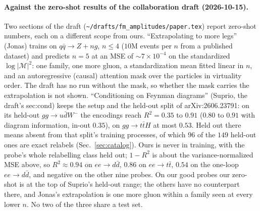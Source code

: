 \documentclass[11pt]{article}
\newcommand{\code}[1]{\texttt{#1}}
\begin{document}
\paragraph{Against the zero-shot results of the collaboration draft (2026-10-15).} Two sections of the draft
(\code{\textasciitilde/drafts/fm\_amplitudes/paper.tex}) report zero-shot numbers, each on a different scope from ours.
``Extrapolating to more legs'' (Jonas) trains on $q\bar q\to Z+ng$, $n\le4$ ($10$M events per $n$ from a published
dataset) and predicts $n=5$ at an MSE of $\sim7\times10^{-4}$ on the standardized $\log|\mathcal M|^2$: one family,
one more gluon, a standardization mean fitted linear in $n$, and an autoregressive (causal) attention mask over the
particles in virtuality order. The draft has no run without the mask, so whether the mask carries the extrapolation is
not shown. ``Conditioning on Feynman diagrams'' (Suprio, the draft's sec:cond) keeps the setup and the held-out split
of arXiv:2606.23791: on its held-out $gg\to u\bar dW^-$ the encodings reach $R^2=0.35$ to $0.91$ ($0.80$ to $0.91$ with
diagram information, in-out $0.35$), on $gg\to t\bar tH$ at most $0.53$. Held out there means absent from that
split's training processes, of which $96$ of the $149$ held-out ones are exact relabels (Sec.~\ref{sec:catalog}).
Ours is never in training, with the probe's whole relabelling class held out; $1-R^2$ is about the variance-normalized
MSE above, so $R^2\approx0.94$ on $ee\to d\bar d$, $0.86$ on $ee\to t\bar t$, $0.54$ on the one-loop $ee\to d\bar d$,
and negative on the other nine probes. On our good probes our zero-shot is at the top of Suprio's held-out range; the
others have no counterpart there, and Jonas's extrapolation is one more gluon within a family seen at every lower $n$. No two
of the three share a test set.
\end{document}

